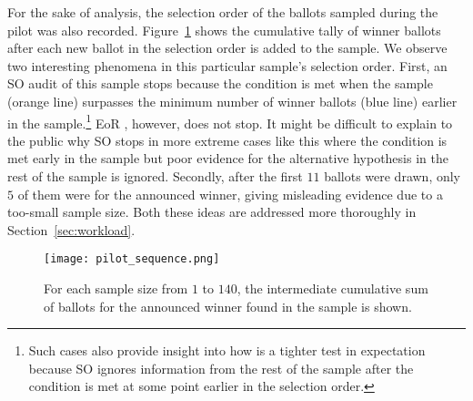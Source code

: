 For the sake of analysis, the selection order of the ballots sampled during the pilot was also recorded. Figure~\ref{fig:pilot_sequence} shows the cumulative tally of winner ballots after each new ballot in the selection order is added to the sample. We observe two interesting phenomena in this particular sample's selection order. First, an SO \BRAVO audit of this sample stops because the \BRAVO condition is met when the sample (orange line) surpasses the minimum number of winner ballots (blue line) earlier in the sample.\footnote{Such cases also provide insight into how \Providence is a tighter test in expectation because SO \BRAVO ignores information from the rest of the sample after the \BRAVO condition is met at some point earlier in the selection order.} EoR \BRAVO, however, does not stop. It might be difficult to explain to the public why SO \BRAVO stops in more extreme cases like this where the condition is met early in the sample but poor evidence for the alternative hypothesis in the rest of the sample is ignored. Secondly, after the first $11$ ballots were drawn, only $5$ of them were for the announced winner, giving misleading evidence due to a too-small sample size. Both these ideas are addressed more thoroughly in Section~\ref{sec:workload}.

\begin{figure}
\texttt{[image: pilot\_sequence.png]}
\caption{For each sample size from $1$ to $140$, the intermediate cumulative sum of ballots for the announced winner found in the sample is shown.}
\label{fig:pilot_sequence}
\end{figure}




